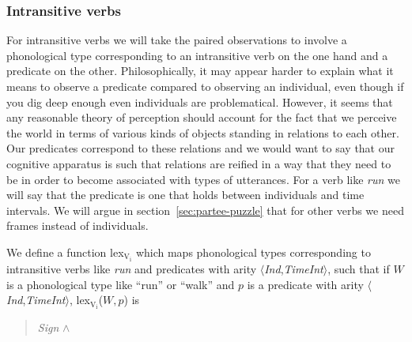 \subsubsection{Intransitive verbs}\label{pg:lexicon-iv}

For intransitive verbs we will take the paired observations to involve
a phonological type corresponding to an intransitive verb on the one
hand and a predicate on the other.  Philosophically, it may appear
harder to explain what it means to observe a predicate compared to
observing an individual, even though if you dig deep enough even
individuals are problematical.  However, it seems that any reasonable
theory of perception should account for the fact that we perceive the
world in terms of various kinds of objects standing in relations to
each other.  Our predicates correspond to these relations and we would
want to say that our cognitive apparatus is such that relations are
reified in a way that they need to be in order to become associated
with types of utterances.  For a verb like \textit{run} we will say
that the predicate is one that holds between individuals and time
intervals.  We will argue in section~\ref{sec:partee-puzzle} that for
other verbs we need frames instead of individuals.

We define a function lex$_{\mathrm{V_{\mathrm{i}}}}$ which maps phonological types corresponding to intransitive verbs like
\textit{run} and predicates with arity
$\langle$\textit{Ind},\textit{TimeInt}$\rangle$, such that if $W$ is
a phonological type like ``run'' or ``walk'' and $p$ is a predicate with arity $\langle$\textit{Ind},\textit{TimeInt}$\rangle$,
lex$_{\mathrm{V_{\mathrm{i}}}}$($W,p$) is
\begin{quote}
\hspace*{-2em}\textit{Sign} \d{$\wedge$} \\
\hspace*{-2em}

\end{quote}

